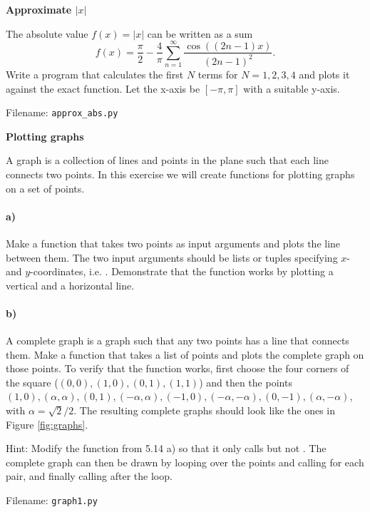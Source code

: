 \begin{Problem}{\textbf{Approximate $|x|$}}

\noindent The absolute value $f(x)=|x|$ can be written as a sum
\begin{equation*}
	f(x)=\frac{\pi}{2}-\frac{4}{\pi} \sum_{n=1}^\infty \frac{\cos((2n-1)x)}{(2n-1)^2}.
\end{equation*}
Write a program that calculates the first $N$ terms for $N=1,2,3,4$ and plots it against
the exact function. Let the x-axis be $[-\pi,\pi]$ with a suitable y-axis.

Filename: \texttt{approx\_abs.py}
\end{Problem}

\begin{Problem}{\textbf{Plotting graphs}}

\noindent A graph is a collection of lines and points in the plane
such that each line connects two points. In this exercise we will create functions for
plotting graphs on a set of points.

\paragraph{a)}
Make a function  that takes two points as input arguments
and plots the line between them. The two input arguments should be lists or tuples specifying
$x$- and $y$-coordinates, i.e. . Demonstrate that the function works by plotting a vertical and a horizontal line.

\paragraph{b)}
A complete graph is a graph such that any two points has a line that connects them. Make a function that takes a list of points and plots the complete graph on those points. To verify that the
function works, first choose the four corners of the square ($(0,0),(1,0),(0,1),(1,1)$)
and then the points $(1,0), (\alpha,\alpha), (0,1), (-\alpha,\alpha),
(-1,0), (-\alpha,-\alpha),(0,-1), (\alpha,-\alpha)$, with $\alpha=\sqrt{2}/2$. The resulting
complete graphs should look like the ones in Figure \ref{fig:graphs}.

Hint: Modify the  function from 5.14 a) so that it only calls
 but not . The complete graph can then be drawn by
looping over the points and calling  for each pair, and finally calling
 after the loop.

Filename: \texttt{graph1.py}
\end{Problem}

